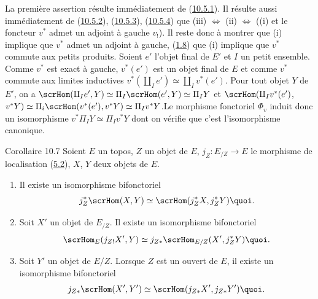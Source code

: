 \subsubsection{}
La première assertion résulte immédiatement de
(\hyperref[IV.subsubsec10.5.1]{10.5.1}). Il résulte aussi immédiatement de
(\hyperref[IV.subsubsec10.5.2]{10.5.2}), (\hyperref[IV.subsubsec10.5.3]{10.5.3}),
(\hyperref[IV.subsubsec10.5.4]{10.5.4}) que (iii) $\Leftrightarrow$ (ii)
$\Leftrightarrow$ ((i) et le foncteur $v^{\ast}$ admet un adjoint à
gauche $v_{!}$). Il reste donc à montrer que (i) implique que
$v^{\ast}$ admet un adjoint à gauche, \ie (\hyperref[IV.rem1.8]{1.8}) que (i)
implique que $v^{\ast}$ commute aux petits produits. Soient $e'$
l'objet final de $E'$ et $I$ un petit ensemble. Comme $v^{\ast}$ est
exact à gauche, $v^{\ast}(e')$ est un objet final de $E$ et comme
$v^{\ast}$ commute aux limites inductives $v^{\ast}(\amalg_I
e')\simeq \amalg_I v^{\ast}(e')$. Pour tout objet $Y$ de $E'$, on a
$\scrHom(\amalg_I e', Y)\simeq \Pi_I\scrHom(e',Y)\simeq \Pi_I Y$ et
$\scrHom(\amalg_I v^{\ast}(e')$, $v^{\ast}Y)\simeq
\Pi_i\scrHom(v^{\ast}(e'), v^{\ast}Y)\simeq \Pi_I
v^{\ast}Y$.\pageoriginale Le morphisme fonctoriel $\Phi_v$ induit
donc un isomorphisme $v^{\ast}\Pi_I Y\simeq \Pi_I v^{\ast}Y$ dont on
vérifie que c'est l'isomorphisme canonique. \cqfd

\begin{enonce*}{Corollaire 10.7}
Soient $E$ un topos, $Z$ un objet de $E$, $j_Z:E_{/Z}\rightarrow E$
le morphisme de localisation (\hyperref[IV.subsec5.2]{5.2}), $X$, $Y$
deux objets de $E$.
\begin{enumerate}
\renewcommand{\labelenumi}{\theenumi)}
\item Il existe un isomorphisme bifonctoriel
$$
j^{\ast}_Z\scrHom(X,Y)\simeq \scrHom(j^{\ast}_ZX,
j^{\ast}_ZY){\quoi}.
$$

\item Soit $X'$ un objet de $E_{/Z}$. Il existe un isomorphisme
bifonctoriel
$$
\scrHom_E(j_{Z!}X',Y)\simeq j_{Z\ast}\scrHom_{E/Z}(X',j^{\ast}_Z
Y){\quoi}.
$$

\item Soit $Y'$ un objet de $E/Z$. Lorsque $Z$ est un ouvert de $E$,
il existe un isomorphisme bifonctoriel
$$
j_{Z\ast}\scrHom(X',Y')\simeq \scrHom(j_{Z\ast}X',
j_{Z\ast}Y'){\quoi}.
$$
\end{enumerate}
\end{enonce*}

